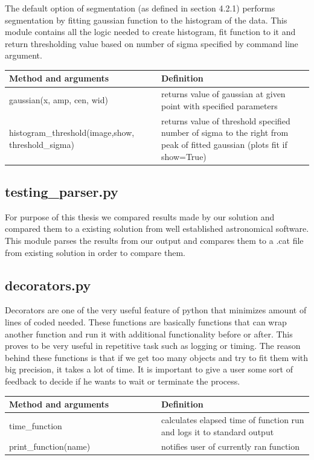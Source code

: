 \documentclass[12pt, a4paper, oneside]{book}
\begin{document}
The default option of segmentation (as defined in section 4.2.1) performs segmentation by fitting gaussian function to the histogram of the data.
This module contains all the logic needed to create histogram, fit function to it and return thresholding value based on number of sigma specified by command line argument.

\begin{center}
    \begin{tabular}  { | p{0.5\linewidth} | p{0.5\linewidth} | }
        \hline
        Method and arguments & Definition \\
        \hline
        gaussian(x, amp, cen, wid) & returns value of gaussian at given point with specified parameters \\
        \hline
        histogram\_threshold(image,show, threshold\_sigma) & returns value of threshold specified number of sigma to the right from peak of fitted gaussian (plots fit if show=True) \\
        \hline
    \end{tabular}
\end{center}

\subsection{testing\_parser.py}

For purpose of this thesis we compared results made by our solution and compared them to a existing solution from well established astronomical software.
This module parses the results from our output and compares them to a .cat file from existing solution in order to compare them.

\subsection{decorators.py}

Decorators are one of the very useful feature of python that minimizes amount of lines of coded needed.
These functions are basically functions that can wrap another function and run it with additional functionality before or after.
This proves to be very useful in repetitive task such as logging or timing.
The reason behind these functions is that if we get too many objects and try to fit them with big precision, it takes a lot of time.
It is important to give a user some sort of feedback to decide if he wants to wait or terminate the process.

\begin{center}
    \begin{tabular}  { | p{0.5\linewidth} | p{0.5\linewidth} | }
        \hline
        Method and arguments & Definition \\
        \hline
        time\_function & calculates elapsed time of function run and logs it to standard output\\
        \hline
        print\_function(name) & notifies user of currently ran function \\
        \hline
    \end{tabular}
\end{center}
\end{document}
